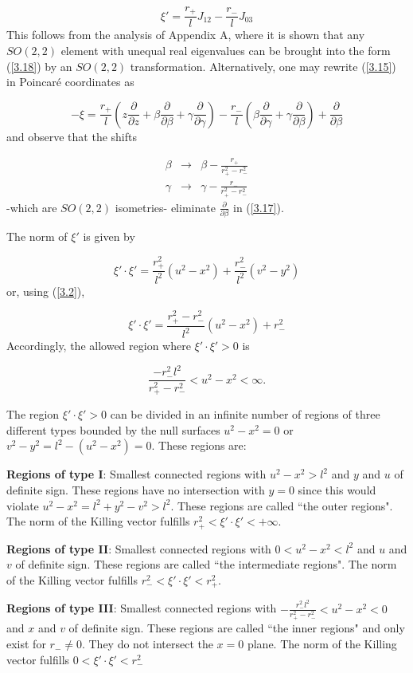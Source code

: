 \documentclass[12pt]{article}
\newcounter{c1} \newcounter{c2}
\newcommand{\bb}{\begin{equation}}
\newcommand{\ee}{\end{equation}}
\newcommand{\p}{\partial}
\newcommand{\br}{\begin{eqnarray}}
\newcommand{\er}{\end{eqnarray}}
\begin{document}
\bb
\xi' = \frac{r_{+}}{l}J_{12} - \frac{r_{-}}{l}J_{03}
\label{3.18}
\ee
%
This follows from the analysis of Appendix A, where it is shown
that any $SO(2,2)$ element with unequal real eigenvalues can be
brought into the form (\ref{3.18}) by an $SO(2,2)$
transformation. Alternatively, one may rewrite (\ref{3.15}) in
Poincar\'e coordinates as

\bb
-\xi =\frac{r_{+}}{l} \left(z\frac{\p}{\p z} + \beta
\frac{\p}{\p \beta} + \gamma \frac{\p}{\p
\gamma}\right) - \frac{r_{-}}{l}\left(\beta \frac{\p}{\p \gamma}
+ \gamma \frac{\p}{\p \beta}\right) +
\frac{\p}{\p \beta}
\label{3.17}
\ee
%
and observe that the shifts

\br
\beta &\rightarrow& \beta - \frac{r_{+}}{r_{+}^2 - r_{-}^2}
\label{3.19.a} \\
\gamma &\rightarrow& \gamma - \frac{r_{-}}{r_{+}^2 - r_{-}^2}
\label{3.19.b}
\er
%
-which are $SO(2,2)$ isometries- eliminate $\frac{\p}{\p
\beta}$ in (\ref{3.17}).

The norm of $\xi '$ is given by

\bb
\xi '\cdot \xi ' = \frac{r_{+}^2}{l^2}(u^2 - x^2) +
\frac{r_{-}^2}{l^2}( v^2 - y^2)
\label{3.20}
\ee
%
or, using (\ref{3.2}),

\bb
\xi '\cdot \xi '= \frac{r_{+}^2 - r_{-}^2}{l^2} (u^2 - x^2) +r_{-}^2
\ee
%
Accordingly, the allowed region where $\xi ' \cdot \xi '>0$ is

\bb
\frac{-r_{-}^2l^2}{r_{+}^2 - r_{-}^2} < u^2 - x^2 < \infty.
\ee

The region $\xi '\cdot \xi ' >0$ can be divided in an infinite
number of regions of three different types bounded by the null
surfaces $u^2 - x^2 =0$ or $v^2 - y^2 = l^2 - (u^2 - x^2) =0$. These regions
 are:

{\bf Regions of type I}: Smallest connected regions with $u^2 - x^2 >l^2$ and
 $y$ and $u$ of definite sign. These regions have no intersection with $y
= 0$ since this would violate $u^2 - x^2 = l^2 + y^2 - v^2 >
l^2$. These regions are called ``the outer regions". The norm of the Killing
 vector fulfills  $r_{+}^2 < \xi '\cdot \xi '<+\infty$.

{\bf Regions of type II}: Smallest connected regions with $0<u^2 - x^2 < l^2$
and $u$ and $v$ of definite sign. These regions are called ``the intermediate
 regions". The norm of the Killing vector fulfills  $r_{-}^2 < \xi '\cdot \xi
 '<r_{+}^2$.

{\bf Regions of type III}: Smallest connected regions with
 $-\frac{r_{-}^2l^2}{r_{+}^2 - r_{-}^2} <
u^2 - x^2 <0$ and $x$ and $v$ of definite sign. These regions are
called ``the inner regions" and only exist for $r_{-} \neq 0$. They
do not intersect the $x = 0$ plane. The norm of the Killing vector fulfills
$0< \xi '\cdot \xi '< r_{-}^2$
\end{document}
